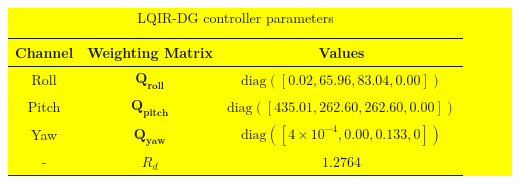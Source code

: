 \documentclass[3p]{elsarticle}
\begin{document}
\begin{table}[H]
    \label{tab:control weight_new}
    \centering
    \colorbox{yellow}{ %
    \begin{minipage}{\linewidth} %
        \label{tab:control weight_new}
        \caption{LQIR-DG controller parameters}
        \renewcommand{\arraystretch}{1.3}
        \centering
        \begin{tabular}{@{}ccc@{}}
            
        \toprule
        Channel & Weighting Matrix & Values \\
        \midrule
        Roll & $\mathbf{Q_{roll}}$ & $\text{diag}([0.02, 65.96, 83.04, 0.00])$ \\
        Pitch & $\mathbf{Q_{pitch}}$ & $\text{diag}([435.01, 262.60, 262.60, 0.00])$ \\
        Yaw & $\mathbf{Q_{yaw}}$ & $\text{diag}([4 \times 10^{-4}, 0.00, 0.133, 0])$ \\
        -&$R_d$ & $1.2764$ \\
        \bottomrule
        \end{tabular}
    \end{minipage}
    \label{tab:control weight_new}
    }
    \label{tab:control weight_new}
\end{table}
\end{document}
